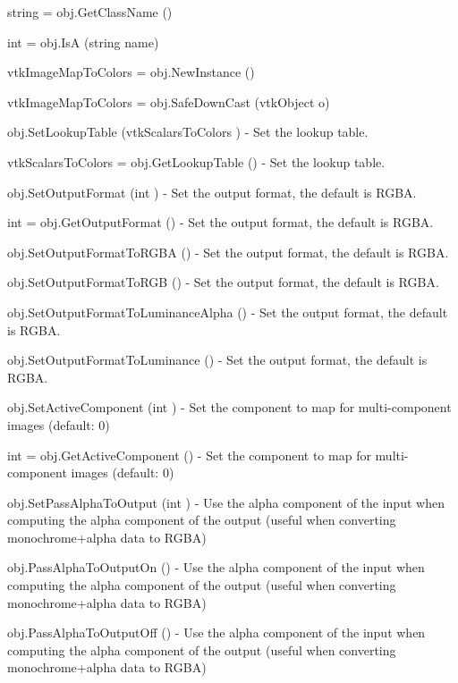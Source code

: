 \begin{DoxyItemize}
\item {\ttfamily string = obj.\-Get\-Class\-Name ()}  
\item {\ttfamily int = obj.\-Is\-A (string name)}  
\item {\ttfamily vtk\-Image\-Map\-To\-Colors = obj.\-New\-Instance ()}  
\item {\ttfamily vtk\-Image\-Map\-To\-Colors = obj.\-Safe\-Down\-Cast (vtk\-Object o)}  
\item {\ttfamily obj.\-Set\-Lookup\-Table (vtk\-Scalars\-To\-Colors )} -\/ Set the lookup table.  
\item {\ttfamily vtk\-Scalars\-To\-Colors = obj.\-Get\-Lookup\-Table ()} -\/ Set the lookup table.  
\item {\ttfamily obj.\-Set\-Output\-Format (int )} -\/ Set the output format, the default is R\-G\-B\-A.  
\item {\ttfamily int = obj.\-Get\-Output\-Format ()} -\/ Set the output format, the default is R\-G\-B\-A.  
\item {\ttfamily obj.\-Set\-Output\-Format\-To\-R\-G\-B\-A ()} -\/ Set the output format, the default is R\-G\-B\-A.  
\item {\ttfamily obj.\-Set\-Output\-Format\-To\-R\-G\-B ()} -\/ Set the output format, the default is R\-G\-B\-A.  
\item {\ttfamily obj.\-Set\-Output\-Format\-To\-Luminance\-Alpha ()} -\/ Set the output format, the default is R\-G\-B\-A.  
\item {\ttfamily obj.\-Set\-Output\-Format\-To\-Luminance ()} -\/ Set the output format, the default is R\-G\-B\-A.  
\item {\ttfamily obj.\-Set\-Active\-Component (int )} -\/ Set the component to map for multi-\/component images (default\-: 0)  
\item {\ttfamily int = obj.\-Get\-Active\-Component ()} -\/ Set the component to map for multi-\/component images (default\-: 0)  
\item {\ttfamily obj.\-Set\-Pass\-Alpha\-To\-Output (int )} -\/ Use the alpha component of the input when computing the alpha component of the output (useful when converting monochrome+alpha data to R\-G\-B\-A)  
\item {\ttfamily obj.\-Pass\-Alpha\-To\-Output\-On ()} -\/ Use the alpha component of the input when computing the alpha component of the output (useful when converting monochrome+alpha data to R\-G\-B\-A)  
\item {\ttfamily obj.\-Pass\-Alpha\-To\-Output\-Off ()} -\/ Use the alpha component of the input when computing the alpha component of the output (useful when converting monochrome+alpha data to R\-G\-B\-A)  

\end{DoxyItemize}
